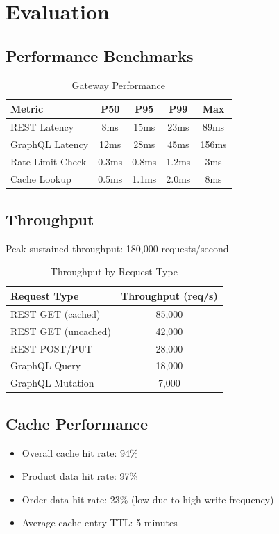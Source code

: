 \section{Evaluation}


\subsection{Performance Benchmarks}

\begin{table}[h]
\centering
\caption{Gateway Performance}
\begin{tabular}{lcccc}
\toprule
\textbf{Metric} & \textbf{P50} & \textbf{P95} & \textbf{P99} & \textbf{Max} \\
\midrule
REST Latency & 8ms & 15ms & 23ms & 89ms \\
GraphQL Latency & 12ms & 28ms & 45ms & 156ms \\
Rate Limit Check & 0.3ms & 0.8ms & 1.2ms & 3ms \\
Cache Lookup & 0.5ms & 1.1ms & 2.0ms & 8ms \\
\bottomrule
\end{tabular}
\end{table}

\subsection{Throughput}

Peak sustained throughput: 180,000 requests/second

\begin{table}[h]
\centering
\caption{Throughput by Request Type}
\begin{tabular}{lc}
\toprule
\textbf{Request Type} & \textbf{Throughput (req/s)} \\
\midrule
REST GET (cached) & 85,000 \\
REST GET (uncached) & 42,000 \\
REST POST/PUT & 28,000 \\
GraphQL Query & 18,000 \\
GraphQL Mutation & 7,000 \\
\bottomrule
\end{tabular}
\end{table}

\subsection{Cache Performance}

\begin{itemize}
    \item Overall cache hit rate: 94\%
    \item Product data hit rate: 97\%
    \item Order data hit rate: 23\% (low due to high write frequency)
    \item Average cache entry TTL: 5 minutes
\end{itemize}

